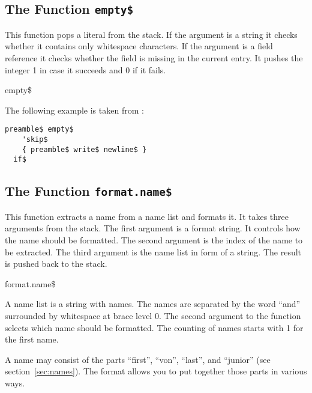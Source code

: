 \subsection{The Function \texttt{empty\$}}%

This function pops a literal from the stack. If the argument is a
string it checks whether it contains only whitespace characters. If
the argument is a field reference it checks whether the field is
missing in the current entry. It pushes the integer 1 in case it
succeeds and 0 if it fails.

\begin{BstFunction}{empty\$}
\end{BstFunction}

The following example is taken from :

\begin{lstlisting}[language=bst]
  preamble$ empty$
    'skip$
    { preamble$ write$ newline$ }
  if$
\end{lstlisting}%


\subsection{The Function \texttt{format.name\$}}%

This function extracts a name from a name list and formats it. It
takes three arguments from the stack. The first argument is a format
string. It controls how the name should be formatted. The second
argument is the index of the name to be extracted. The third argument
is the name list in form of a string. The result is pushed back to the
stack.

\begin{BstFunction}{format.name\$}
\end{BstFunction}

A name list is a string with names. The names are separated by the
word ``and'' surrounded by whitespace at brace level 0. The second
argument to the function selects which name should be formatted. The
counting of names starts with 1 for the first name.

A name may consist of the parts ``first'', ``von'', ``last'', and
``junior'' (see section~\ref{sec:names}). The format allows you to put
together those parts in various ways.

